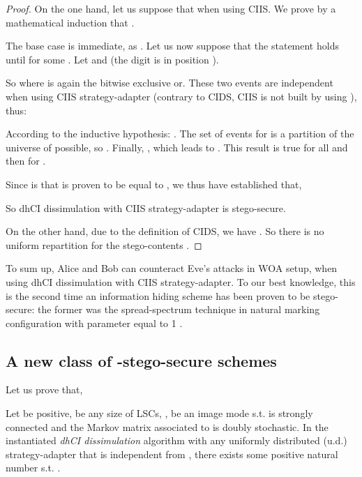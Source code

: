 \documentclass{comjnl}
\begin{document}
\begin{proof}   On   the    one   hand,   let   us   suppose    that     when  using  \linebreak CIIS.
We  prove  by  a
mathematical   induction   that   .

The     base     case     is     immediate,     as     . Let us now suppose that the statement   holds  until for  some . 
Let     and   \linebreak    (the digit  is in position ).

So    
 where  
 is again the bitwise exclusive or. 
These  two events are  independent when
using CIIS strategy-adapter 
(contrary to CIDS, CIIS is not built by using ),
 thus:
 

According to the
inductive    hypothesis:   .  The set  of events  for   is  a partition  of  the universe  of possible,  so
.                  Finally,
,   which    leads   to   .   This  result  is  true  for all   and then for .

Since  is  that is proven to be equal to ,
we thus  have established that, 
 
So   dhCI   dissimulation   with   CIIS
strategy-adapter is stego-secure.

On  the  other  hand,  due  to  the  definition  of  CIDS,  we  have  \linebreak
. 
So   there  is   no  uniform  repartition   for  the stego-contents .
\end{proof}



To sum up, Alice  and Bob can counteract Eve's attacks in  WOA setup, when using
dhCI dissimulation with  CIIS strategy-adapter.  To our best  knowledge, this is
the second time an information hiding scheme has been proven to be stego-secure:
the   former  was   the  spread-spectrum   technique  in   natural  marking
configuration with  parameter equal to 1 \cite{Cayre2008}.





\subsection{A new class of -stego-secure schemes}

Let us prove that,
\begin{theorem}\label{th:stego}
Let  be positive,
 be any size of LSCs, 
,
 be an image mode s.t. 
 is strongly connected and 
the Markov matrix associated to  
is doubly stochastic. 
In the instantiated \emph{dhCI dissimulation} algorithm 
with any uniformly distributed (u.d.) strategy-adapter 
that is independent from ,  
there exists some positive natural number  s.t.
. 
\end{theorem}
\end{document}
